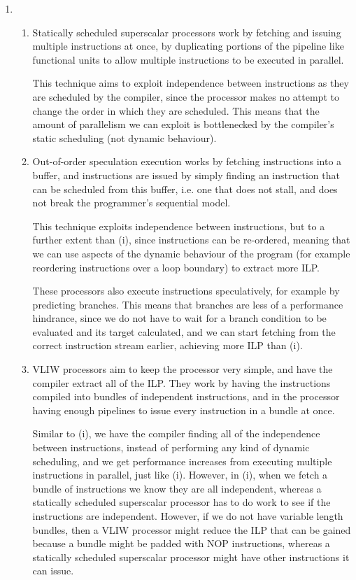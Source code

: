 


\begin{enumerate}[label=(\alph*)]

  \item
    \begin{enumerate}[label=(\roman*)]

      \item
        Statically scheduled superscalar processors work by fetching and issuing multiple instructions at once, by duplicating portions of the pipeline like functional units to allow multiple instructions to be executed in parallel.

        This technique aims to exploit independence between instructions as they are scheduled by the compiler, since the processor makes no attempt to change the order in which they are scheduled. This means that the amount of parallelism we can exploit is bottlenecked by the compiler's static scheduling (not dynamic behaviour).

        \item
          Out-of-order speculation execution works by fetching instructions into a buffer, and instructions are issued by simply finding an instruction that can be scheduled from this buffer, i.e. one that does not stall, and does not break the programmer's sequential model.

          This technique exploits independence between instructions, but to a further extent than (i), since instructions can be re-ordered, meaning that we can use aspects of the dynamic behaviour of the program (for example reordering instructions over a loop boundary) to extract more ILP.

          These processors also execute instructions speculatively, for example by predicting branches. This means that branches are less of a performance hindrance, since we do not have to wait for a branch condition to be evaluated and its target calculated, and we can start fetching from the correct instruction stream earlier, achieving more ILP than (i).

          \item
            VLIW processors aim to keep the processor very simple, and have the compiler extract all of the ILP. They work by having the instructions compiled into bundles of independent instructions, and in the processor having enough pipelines to issue every instruction in a bundle at once.

            Similar to (i), we have the compiler finding all of the independence between instructions, instead of performing any kind of dynamic scheduling, and we get performance increases from executing multiple instructions in parallel, just like (i). However, in (i), when we fetch a bundle of instructions we know they are all independent, whereas a statically scheduled superscalar processor has to do work to see if the instructions are independent. However, if we do not have variable length bundles, then a VLIW processor might reduce the ILP that can be gained because a bundle might be padded with NOP instructions, whereas a statically scheduled superscalar processor might have other instructions it can issue.


\end{enumerate}
\end{enumerate}
